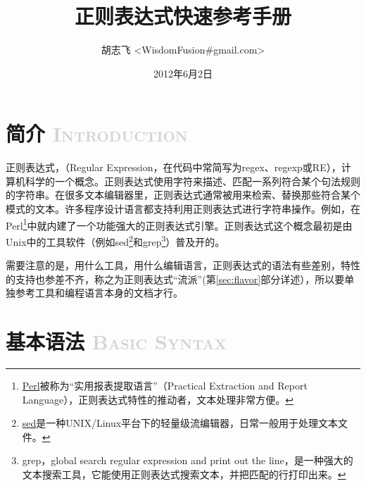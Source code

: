 \documentclass[12pt,a4paper,twoside]{ctexart}
\begin{document}
\title{正则表达式快速参考手册}
\author{胡志飞 <WisdomFusion\#gmail.com>}
\date{2012年6月2日}

\maketitle{}
\thispagestyle{empty}
\clearpage{}

\tableofcontents{}
\thispagestyle{empty}
\clearpage{}

\setcounter{page}{1}

\section[简介]{简介 \textcolor{lightgray}{\textsc{Introduction}}}
\label{sec:intro}

正则表达式，（Regular Expression，在代码中常简写为regex、regexp或RE），计算机科学的一个概念。正则表达式使用字符来描述、匹配一系列符合某个句法规则的字符串。在很多文本编辑器里，正则表达式通常被用来检索、替换那些符合某个模式的文本。许多程序设计语言都支持利用正则表达式进行字符串操作。例如，在Perl\footnote{\href{https://www.perl.org/}{Perl}被称为“实用报表提取语言”（Practical Extraction and Report Language），正则表达式特性的推动者，文本处理非常方便。}中就内建了一个功能强大的正则表达式引擎。正则表达式这个概念最初是由Unix中的工具软件（例如sed\footnote{\href{http://www.gnu.org/software/sed/manual/sed.html}{sed}是一种UNIX/Linux平台下的轻量级流编辑器，日常一般用于处理文本文件。}和grep\footnote{grep，global search regular expression and print out the line，是一种强大的文本搜索工具，它能使用正则表达式搜索文本，并把匹配的行打印出来。}）普及开的。\par

需要注意的是，用什么工具，用什么编辑语言，正则表达式的语法有些差别，特性的支持也参差不齐，称之为正则表达式“流派”(第\ref{sec:flavor}部分详述），所以要单独参考工具和编程语言本身的文档才行。\par

\section[基本语法]{基本语法 \textcolor{lightgray}{\textsc{Basic Syntax}}}
\label{sec:basic-syntax}
\end{document}

